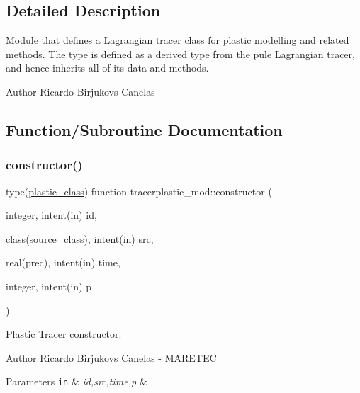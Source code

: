 \subsection{Detailed Description}
Module that defines a Lagrangian tracer class for plastic modelling and related methods. The type is defined as a derived type from the pule Lagrangian tracer, and hence inherits all of it\textquotesingle{}s data and methods. 

\begin{DoxyAuthor}{Author}
Ricardo Birjukovs Canelas 
\end{DoxyAuthor}


\subsection{Function/\+Subroutine Documentation}
\mbox{\label{namespacetracerplastic__mod_ae68444b860b6e7abf3940b0ee1bfe57a}} 
\subsubsection{\texorpdfstring{constructor()}{constructor()}}
{\footnotesize\ttfamily type(\mbox{\hyperlink{structtracerplastic__mod_1_1plastic__class}{plastic\+\_\+class}}) function tracerplastic\+\_\+mod\+::constructor (\begin{DoxyParamCaption}\item[{integer, intent(in)}]{id,  }\item[{class(\mbox{\hyperlink{structsources__mod_1_1source__class}{source\+\_\+class}}), intent(in)}]{src,  }\item[{real(prec), intent(in)}]{time,  }\item[{integer, intent(in)}]{p }\end{DoxyParamCaption})\hspace{0.3cm}{\ttfamily [private]}}



Plastic Tracer constructor. 

\begin{DoxyAuthor}{Author}
Ricardo Birjukovs Canelas -\/ M\+A\+R\+E\+T\+EC 
\end{DoxyAuthor}

\begin{DoxyParams}[1]{Parameters}
\mbox{\tt in}  & {\em id,src,time,p} & \\
\hline
\end{DoxyParams}


